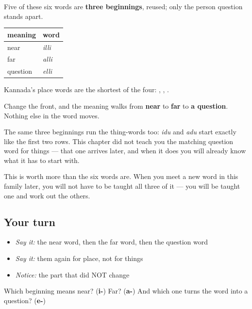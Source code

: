 \begin{grammarlens}[title={Grammar lens: one slot changes}]
Five of these six words are \textbf{three beginnings}, reused; only the person question stands apart.

\noindent
\begin{tabularx}{\linewidth}{@{}>{\raggedright\arraybackslash}X>{\raggedright\arraybackslash}X@{}}
\toprule
\textbf{meaning} & \textbf{word} \\
\midrule
near & \textbf{\kn{ಇಲ್ಲಿ}} \emph{illi} \\
far & \textbf{\kn{ಅಲ್ಲಿ}} \emph{alli} \\
question & \textbf{\kn{ಎಲ್ಲಿ}} \emph{elli} \\
\bottomrule
\end{tabularx}

Kannada's place words are the shortest of the four: , , .

Change the front, and the meaning walks from \textbf{near} to \textbf{far} to \textbf{a question}. Nothing else in the word moves.

The same three beginnings run the thing-words too: \textbf{} \emph{idu} and \textbf{} \emph{adu} start exactly like the first two rows. This chapter did not teach you the matching question word for things — that one arrives later, and when it does you will already know what it has to start with.

This is worth more than the six words are. When you meet a new word in this family later, you will not have to be taught all three of it — you will be taught one and work out the others.
\end{grammarlens}

\subsection*{Your turn}
\begin{itemize}
\raggedright
  \item \emph{Say it:} the near word, then the far word, then the question word
  \item \emph{Say it:} them again for place, not for things
  \item \emph{Notice:} the part that did NOT change
\end{itemize}

\begin{tcolorbox}[breakable,colback=teal!4,colframe=teal!35!black,title={Before you move on}]
Which beginning means near? (\textbf{i-}) Far? (\textbf{a-}) And which one turns the word into a question? (\textbf{e-})
\end{tcolorbox}
